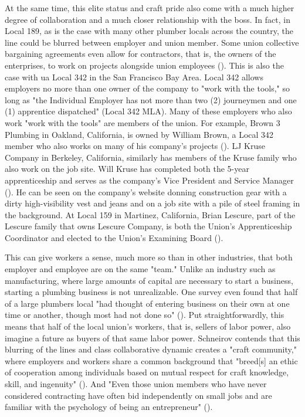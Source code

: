 \documentclass[12pt]{article}
\begin{document}
At the same time, this elite status and craft pride also come with a much higher degree of collaboration and a much closer relationship with the boss. In fact, in Local 189, as is the case with many other plumber locals across the country, the line could be blurred between employer and union member. Some union collective bargaining agreements even allow for contractors, that is, the owners of the enterprises, to work on projects alongside union employees (\cite[5]{schneirovPrideSolidarityHistory1993}). This is also the case with \acrshort{ua} Local 342 in the San Francisco Bay Area. Local 342 allows employers no more than one owner of the company to "work with the tools," so long as "the Individual Employer has not more than two (2) journeymen and one (1) apprentice dispatched" (Local 342 MLA). Many of these employers who also work "work with the tools" are members of the union. For example, Brown 3 Plumbing in Oakland, California, is owned by William Brown, a Local 342 member who also works on many of his company’s projects (\cite{brownplumbingExecutiveSummary}). LJ Kruse Company in Berkeley, California, similarly has members of the Kruse family who also work on the job site. Will Kruse has completed both the 5-year apprenticeship and serves as the company’s Vice President and Service Manager (\cite{ljkruseUs}). He can be seen on the company’s website donning construction gear with a dirty high-visibility vest and jeans and on a job site with a pile of steel framing in the background. At Local 159 in Martinez, California, Brian Lescure, part of the Lescure family that owns Lescure Company, is both the Union’s Apprenticeship Coordinator and elected to the Union’s Examining Board (\cite{lescureLinkedIn}).

This can give workers a sense, much more so than in other industries, that both employer and employee are on the same "team." Unlike an industry such as manufacturing, where large amounts of capital are necessary to start a business, starting a plumbing business is not unrealizable. One survey even found that half of a large plumbers local "had thought of entering business on their own at one time or another, though most had not done so" (\cite[5]{schneirovPrideSolidarityHistory1993}). Put straightforwardly, this means that half of the local union’s workers, that is, sellers of labor power, also imagine a future as buyers of that same labor power. Schneirov contends that this blurring of the lines and class collaborative dynamic creates a "craft community," where employers and workers share a common background that "breed[s] an ethic of cooperation among individuals based on mutual respect for craft knowledge, skill, and ingenuity" (\cite[6]{schneirovPrideSolidarityHistory1993}). And "Even those union members who have never considered contracting have often bid independently on small jobs and are familiar with the psychology of being an entrepreneur" (\cite[5--6]{schneirovPrideSolidarityHistory1993}). 
\end{document}
